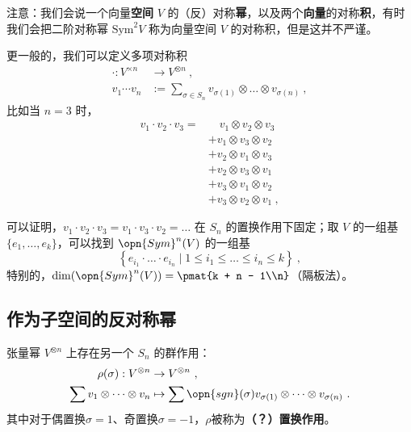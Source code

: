 注意：我们会说一个向量\textbf{空间} $V$ 的（反）对称\textbf{幂}，以及两个\textbf{向量}的对称\textbf{积}，有时我们会把二阶对称幂 $\text{Sym}^2 V$ 称为向量空间 $V$ 的对称积，但是这并不严谨。

更一般的，我们可以定义多项对称积
\begin{equation}
\begin{aligned}
\cdot: V^{\times n} &\to V^{\otimes n}~, \\
v_1 \cdots v_n &:= \sum_{\sigma \in S_n} v_{\sigma(1)} \otimes \dots \otimes v_{\sigma(n)}~,
\end{aligned}
\end{equation}
比如当 $n = 3$ 时，
\begin{equation}
\begin{aligned}
v_1 \cdot v_2 \cdot v_3 = &\quad v_1 \otimes v_2 \otimes v_3 \\
&+ v_1 \otimes v_3 \otimes v_2 \\
&+ v_2 \otimes v_1 \otimes v_3 \\
&+ v_2 \otimes v_3 \otimes v_1 \\
&+ v_3 \otimes v_1 \otimes v_2 \\
&+ v_3 \otimes v_2 \otimes v_1~,
\end{aligned}
\end{equation}

可以证明，$v_1 \cdot v_2 \cdot v_3 = v_1 \cdot v_3 \cdot v_2 = \dots$ 在 $S_n$ 的置换作用下固定；取 $V$ 的一组基 $\{e_1, \dots, e_k\}$，可以找到 $\opn{Sym}^n(V)$ 的一组基
\begin{equation}
\left\{ e_{i_1} \cdot \dots \cdot e_{i_n} \mid 1 \leq i_1 \leq \dots \leq i_n \leq k \right\}~,
\end{equation}
特别的，$\dim(\opn{Sym}^n(V)) = \pmat{k + n - 1\\n}$（隔板法）。

\subsection{作为子空间的反对称幂}

张量幂 $V^{\otimes n}$ 上存在另一个 $S_n$ 的群作用：
\begin{equation}
\begin{aligned}
\rho(\sigma): V^{\otimes n} &\to V^{\otimes n}~, \\
\sum v_1 \otimes \dots \otimes v_n &\mapsto \sum \opn{sgn}(\sigma) v_{\sigma(1)} \otimes \dots \otimes v_{\sigma(n)}~.
\end{aligned}
\end{equation}
其中对于偶置换$\sigma = 1$、奇置换$\sigma = -1$，$\rho$被称为\textbf{（？）置换作用}。

